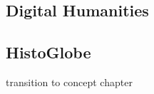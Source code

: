\subsection{Digital Humanities} %
\label{sub:digital_humanities}


\subsection{HistoGlobe} %
\label{sub:histoglobe}




\vspace{2em}

transition to concept chapter